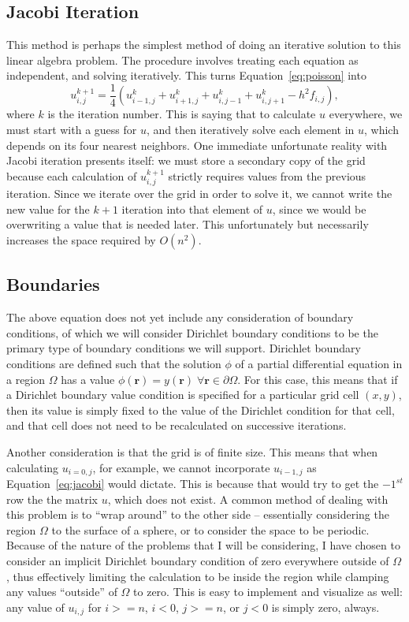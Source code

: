 \subsection{Jacobi Iteration}
This method is perhaps the simplest method of doing an iterative solution to this linear algebra problem. The procedure
involves treating each equation as independent, and solving iteratively. This turns Equation~\ref{eq:poisson} into\cite{poisson-relax}
\begin{equation} \label{eq:jacobi}
u_{i,j}^{k+1} = \frac{1}{4}(u_{i-1,j}^{k} + u_{i+1,j}^{k} + u_{i,j-1}^{k} + u_{i,j+1}^{k} - h^2f_{i,j}),
\end{equation}
where $k$ is the iteration number. This is saying that to calculate $u$ everywhere, we must start with a guess for $u$,
and then iteratively solve each element in $u$, which depends on its four nearest neighbors. One immediate unfortunate
reality with Jacobi iteration presents itself: we must store a secondary copy of the grid because each calculation
of $u_{i,j}^{k+1}$ strictly requires values from the previous iteration. Since we iterate over the grid in order to solve
it, we cannot write the new value for the $k+1$ iteration into that element of $u$, since we would be overwriting a value
that is needed later. This unfortunately but necessarily increases the space required by $O(n^2)$.

\subsection{Boundaries}

The above equation does not yet include any consideration of boundary conditions, of which we will consider Dirichlet boundary
conditions to be the primary type of boundary conditions we will support.
Dirichlet boundary conditions are defined such that the solution $\phi$ of a partial
differential equation in a region $\Omega$ has a value $\phi(\mathbf{r}) = y(\mathbf{r}) \; \forall \mathbf{r} \in \partial \Omega$.
For this case, this means that if a Dirichlet boundary value condition is specified for a particular grid cell $(x,y)$,
then its value is simply fixed to the value of the Dirichlet condition for that cell, and that cell does not need to be recalculated on
successive iterations.

Another consideration is that the grid is of finite size. This means that when calculating $u_{i=0,j}$, for example, we cannot
incorporate $u_{i-1,j}$ as Equation~\ref{eq:jacobi} would dictate. This is because that would try to get the $-1^{st}$ row the
the matrix $u$, which does not exist. A common method of dealing with this problem is to ``wrap around'' to the other side --
essentially considering the region $\Omega$ to the surface of a sphere, or to consider the space to be periodic. Because of
the nature of the problems that I will be considering, I have chosen to consider an implicit Dirichlet boundary condition
of zero everywhere outside of $\Omega$, thus effectively limiting the calculation to be inside the region while clamping any
values ``outside'' of $\Omega$ to zero. This is easy to implement and visualize as well: any value of $u_{i,j}$ for $i >= n$,
$i < 0$, $j >= n$, or $j < 0$ is simply zero, always.

